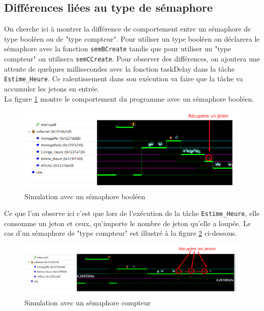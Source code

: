 \documentclass[french]{article}
\begin{document}
	\subsection{Différences liées au type de sémaphore}
	
	On cherche ici à montrer la différence de comportement entre un sémaphore de type booléen ou de "type compteur". Pour utiliser un type booléen on déclarera le sémaphore avec la fonction \texttt{semBCreate} tandis que pour utiliser un "type compteur" on utilisera \texttt{semCCreate}. Pour observer des différences, on ajoutera une attente de quelques millisecondes avec la fonction taskDelay dans la tâche \texttt{Estime\_Heure}. Ce ralentissement dans son exécution va faire que la tâche va accumuler les jetons en entrée.\\
	
	La figure \ref{fig:semB} montre le comportement du programme avec un sémaphore booléen.
	
	\begin{figure}[H]
		\centering
		\includegraphics[width=16cm]{photo/difference_semC_semB/semB}
		\caption{Simulation avec un sémaphore booléen}
		\label{fig:semB}
	\end{figure}

	Ce que l'on observe ici c'est que lors de l'exécution de la tâche \texttt{Estime\_Heure}, elle consomme un jeton et ceux, qu'importe le nombre de jeton qu'elle a loupée. Le cas d'un sémaphore de "type compteur" est illustré à la figure \ref{fig:semC} ci-dessous. 

	\begin{figure}[H]
		\centering
		\includegraphics[width=16cm]{photo/difference_semC_semB/semC}
		\caption{Simulation avec un sémaphore compteur}
		\label{fig:semC}
	\end{figure}
	
\end{document}
